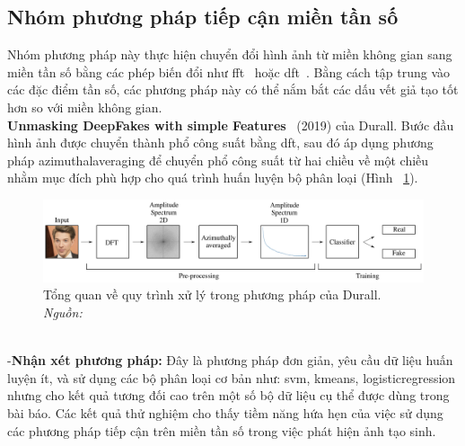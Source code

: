 \subsection{Nhóm phương pháp tiếp cận miền tần số}
Nhóm phương pháp này thực hiện chuyển đổi hình ảnh từ miền không gian sang miền tần số bằng các phép biến đổi như \gls{fft}~\cite{Arunachalam2013TheFF} hoặc \gls{dft}~\cite{1672377}.
Bằng cách tập trung vào các đặc điểm tần số, các phương pháp này có thể nắm bắt các dấu vết giả tạo tốt hơn so với miền không gian.\\
%
\textbf{Unmasking DeepFakes with simple Features}~\cite{durall2019unmasking} (2019) của Durall.
Bước đầu hình ảnh được chuyển thành phổ công suất bằng \gls{dft}, sau đó áp dụng phương pháp \gls{azimuthalaveraging} để chuyển phổ công suất từ hai chiều về một chiều nhằm mục đích phù hợp cho quá trình huấn luyện bộ phân loại (Hình ~\ref{fig:model-unmasking-deepfakes-1}).
%
\begin{figure}[h]
	\centering
	\includegraphics[width=1.0\linewidth]{Images/model-unmasking-deepfakes-1.png}
	\begin{minipage}{0.9\linewidth}
		\caption{Tổng quan về quy trình xử lý trong phương pháp của Durall. \textit{Nguồn: \cite{durall2019unmasking}}}
		\label{fig:model-unmasking-deepfakes-1}
	\end{minipage}
\end{figure}\\
%
%
-\textbf{Nhận xét phương pháp:}
Đây là phương pháp đơn giản, yêu cầu dữ liệu huấn luyện ít, và sử dụng các bộ phân loại cơ bản như: \gls{svm}, \gls{kmeans}, \gls{logisticregression} nhưng cho kết quả tương đối cao trên một số bộ dữ liệu cụ thể được dùng trong bài báo. Các kết quả thử nghiệm cho thấy tiềm năng hứa hẹn của việc sử dụng các phương pháp tiếp cận trên miền tần số trong việc phát hiện ảnh tạo sinh.\\
%
